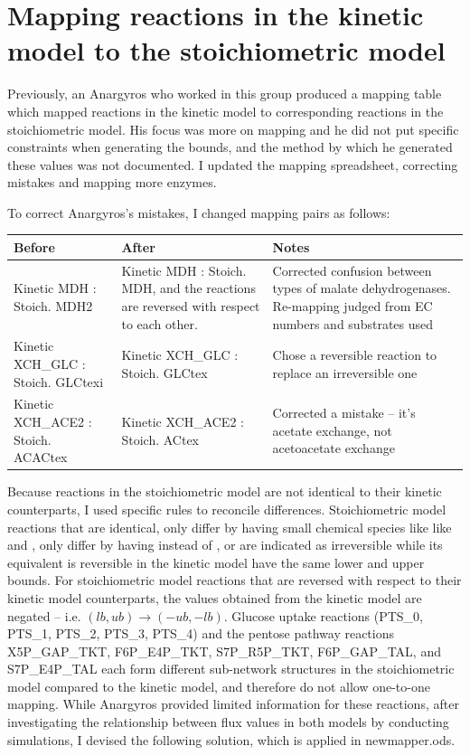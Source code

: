 \documentclass[parskip=full]{scrreprt}
\begin{document}
\section{Mapping reactions in the kinetic model to the stoichiometric model}
\label{sec:mapping}

Previously, an Anargyros who worked in this group produced a mapping table which mapped reactions in the kinetic model to corresponding reactions in the stoichiometric model. His focus was more on mapping and he did not put specific constraints when generating the bounds, and the method by which he generated these values was not documented. I updated the mapping spreadsheet, correcting mistakes and mapping more enzymes.

To correct Anargyros's mistakes, I changed mapping pairs as follows:

\begin{tabularx}{\linewidth}{|L|L|L|}
  \hline
  Before & After & Notes\\
  \hline
  Kinetic MDH : Stoich. MDH2 & Kinetic MDH : Stoich. MDH, and the reactions are reversed with respect to each other. & Corrected confusion between types of malate dehydrogenases. Re-mapping judged from EC numbers and substrates used\\
  \hline
  Kinetic XCH\_GLC : Stoich. GLCtexi & Kinetic XCH\_GLC : Stoich. GLCtex & Chose a reversible reaction to replace an irreversible one\\
  \hline
  Kinetic XCH\_ACE2 : Stoich. ACACtex & Kinetic XCH\_ACE2 : Stoich. ACtex & Corrected a mistake -- it's acetate exchange, not acetoacetate exchange\\
  \hline
\end{tabularx}

Because reactions in the stoichiometric model are not identical to their kinetic counterparts, I used specific rules to reconcile differences. Stoichiometric model reactions that are identical, only differ by having small chemical species like like  and , only differ by having  instead of , or are indicated as irreversible while its equivalent is reversible in the kinetic model have the same lower and upper bounds. For stoichiometric model reactions that are reversed with respect to their kinetic model counterparts, the values obtained from the kinetic model are negated -- i.e. $(lb, ub) \rightarrow (-ub, -lb)$. Glucose uptake reactions (PTS\_0, PTS\_1, PTS\_2, PTS\_3, PTS\_4) and the pentose pathway reactions X5P\_GAP\_TKT, F6P\_E4P\_TKT, S7P\_R5P\_TKT, F6P\_GAP\_TAL, and S7P\_E4P\_TAL each form different sub-network structures in the stoichiometric model compared to the kinetic model, and therefore do not allow one-to-one mapping. While Anargyros provided limited information for these reactions, after investigating the relationship between flux values in both models by conducting simulations, I devised the following solution, which is applied in newmapper.ods.
\end{document}
